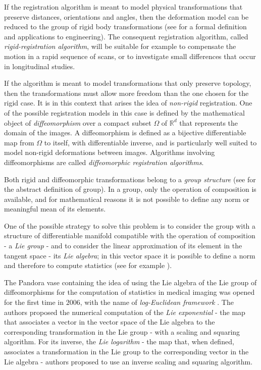 If the registration algorithm is meant to model physical transformations that preserve distances, orientations and angles, then the deformation model can be reduced to the group of rigid body transformations (see \cite{gallier2011geometric} for a formal definition and applications to engineering). The consequent registration algorithm, called \emph{rigid-registration algorithm}, will be suitable for example to compensate the motion in a rapid sequence of scans, or to investigate small differences that occur in longitudinal studies.

If the algorithm is meant to model transformations that only preserve topology, then the transformations must allow more freedom than the one chosen for the rigid case. It is in this context that arises the idea of \emph{non-rigid} registration. One of the possible registration models in this case is defined by the mathematical object of \emph{diffeomorphism} over a compact subset $\Omega$ of $\mathbb{R}^{d}$ that represents the domain of the images. A diffeomorphism is defined as a bijective differentiable map from $\Omega$ to itself, with differentiable inverse, and is particularly well suited to model non-rigid deformations between images. Algorithms involving diffeomorphisms are called \emph{diffeomorphic registration algorithms}.

Both rigid and diffeomorphic transformations belong to a \emph{group structure} (see \cite{artin2011algebra} for the abstract definition of group). In a group, only the operation of composition is available, and for mathematical reasons it is not possible to define any norm or meaningful mean of its elements. 

One of the possible strategy to solve this problem is to consider the group with a structure of differentiable manifold compatible with the operation of composition - a \emph{Lie group} - and to consider the linear approximation of its element in the tangent space - its \emph{Lie algebra}; in this vector space it is possible to define a norm and therefore to compute statistics (see for example \cite{lee2012introduction, arnold2006ordinary, warner, do1976differential, misner1973gravitation, holm2009geometric}).

The Pandora vase containing the idea of using the Lie algebra of the Lie group of diffeomorphisms for the computation of statistics in medical imaging was opened for the first time in $2006$, with the name of \emph{log-Euclidean framework} \cite{Arsigny:MRM:06}.
The authors proposed the numerical computation of the \emph{Lie exponential} - the map that associates a vector in the vector space of the Lie algebra to the corresponding transformation in the Lie group - with a scaling and squaring algorithm. For its inverse, the \emph{Lie logarithm} - the map that, when defined, associates a transformation in the Lie group to the corresponding vector in the Lie algebra - authors proposed to use an inverse scaling and squaring algorithm.

